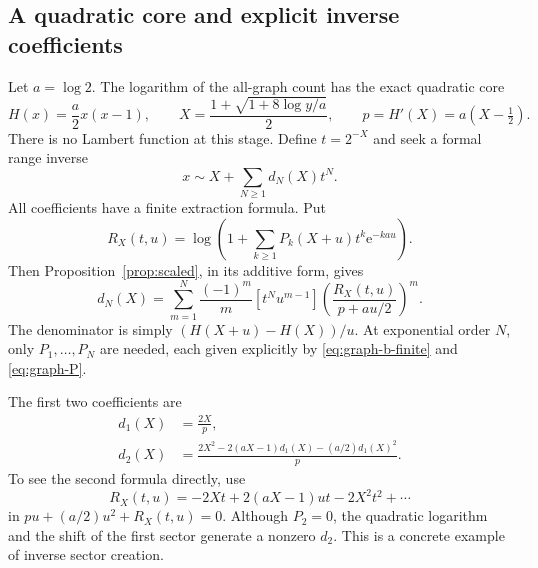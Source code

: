 \documentclass[11pt,a4paper]{article}
\numberwithin{equation}{section}
\theoremstyle{definition}
\theoremstyle{remark}
\newcommand{\ee}{\mathrm e}
\begin{document}
\subsection{A quadratic core and explicit inverse coefficients}

Let $a=\log2$. The logarithm of the all-graph count has the exact quadratic core
\begin{equation}
 H(x)=\frac a2x(x-1),\qquad
 X=\frac{1+\sqrt{1+8\log y/a}}2,
 \qquad p=H'(X)=a(X-\tfrac12).
 \label{eq:graph-core}
\end{equation}
There is no Lambert function at this stage. Define $t=2^{-X}$ and seek a formal range inverse
\begin{equation}
 x\sim X+\sum_{N\ge1}d_N(X)t^N.
 \label{eq:graph-inverse}
\end{equation}
All coefficients have a finite extraction formula. Put
\begin{equation}
 R_X(t,u)=\log\left(1+\sum_{k\ge1}
                 P_k(X+u)t^k\ee^{-kau}\right).
 \label{eq:graph-R}
\end{equation}
Then Proposition~\ref{prop:scaled}, in its additive form, gives
\begin{equation}
 d_N(X)=\sum_{m=1}^{N}\frac{(-1)^m}{m}
 [t^Nu^{m-1}]\left(\frac{R_X(t,u)}{p+au/2}\right)^m.
 \label{eq:graph-d}
\end{equation}
The denominator is simply $(H(X+u)-H(X))/u$. At exponential order $N$, only $P_1,\ldots,P_N$ are needed, each given explicitly by \eqref{eq:graph-b-finite} and \eqref{eq:graph-P}.

The first two coefficients are
\begin{align}
 d_1(X)&=\frac{2X}{p},\nonumber\\
 d_2(X)&=\frac{2X^2-2(aX-1)d_1(X)-(a/2)d_1(X)^2}{p}.
 \label{eq:graph-d-first}
\end{align}
To see the second formula directly, use
\[
 R_X(t,u)=-2Xt+2(aX-1)ut-2X^2t^2+\cdots
\]
in $pu+(a/2)u^2+R_X(t,u)=0$. Although $P_2=0$, the quadratic logarithm and the shift of the first sector generate a nonzero $d_2$. This is a concrete example of inverse sector creation.
\end{document}
